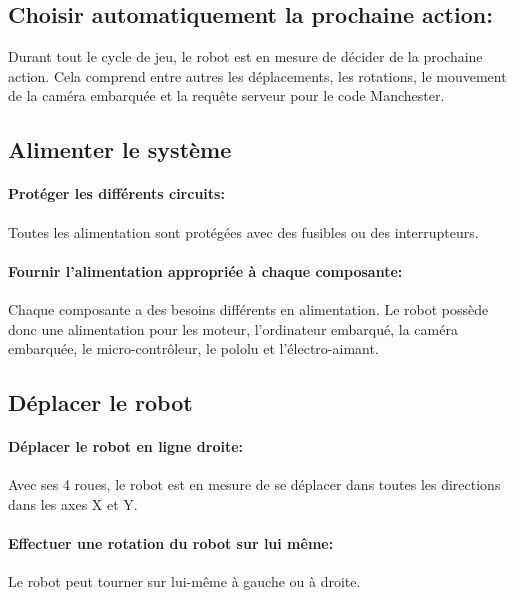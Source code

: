 \subsection{Choisir automatiquement la prochaine action:}

Durant tout le cycle de jeu, le robot est en mesure de décider de la prochaine action. Cela comprend entre autres les déplacements, les rotations, le mouvement de la caméra embarquée
et la requête serveur pour le code Manchester.

\subsection{Alimenter le système}

\paragraph{Protéger les différents circuits:}

Toutes les alimentation sont protégées avec des fusibles ou des interrupteurs.

\paragraph{Fournir l'alimentation appropriée à chaque composante:}

Chaque composante a des besoins différents en alimentation. Le robot possède donc une alimentation pour les moteur, l'ordinateur embarqué, la caméra embarquée, le micro-contrôleur, le pololu et l'électro-aimant.

\subsection{Déplacer le robot}

\paragraph{Déplacer le robot en ligne droite:}

Avec ses 4 roues, le robot est en mesure de se déplacer dans toutes les directions dans les axes X et Y.

\paragraph{Effectuer une rotation du robot sur lui même:}

Le robot peut tourner sur lui-même à gauche ou à droite.

